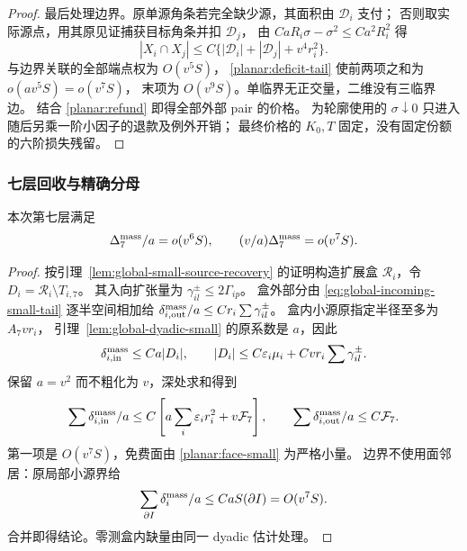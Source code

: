 \begin{proof}
最后处理边界。原单源角条若完全缺少源，其面积由 \(\mathscr D_i\) 支付；
否则取实际源点，用其原见证捕获目标角条并扣 \(\mathscr D_j\)，
由 \(CaR_i\sigma-\sigma^2\le Ca^2R_i^2\) 得
\[
 |X_i\cap X_j|\le
 C\{ |\mathscr D_i|+|\mathscr D_j|+v^4r_i^2\}.
\]
与边界关联的全部端点权为 \(O(v^5S)\)，
\eqref{planar:deficit-tail} 使前两项之和为 \(o(av^5S)=o(v^7S)\)，
末项为 \(O(v^9S)\)。单临界无正交量，二维没有三临界边。
结合 \eqref{planar:refund} 即得全部外部 pair 的价格。
为轮廓使用的 \(\sigma\downarrow0\) 只进入随后另乘一阶小因子的退款及例外开销；
最终价格的 \(K_0,T\) 固定，没有固定份额的六阶损失残留。
\end{proof}

\subsubsection{七层回收与精确分母}

\begin{lemma}[末层真实删除量]\label{planar:deletion}
本次第七层满足
\begin{equation}\label{planar:deletion-small}
 \Delta_7^{\rm mass}/a=o(v^6S),\qquad
 (v/a)\Delta_7^{\rm mass}=o(v^7S).
\end{equation}
\end{lemma}
\begin{proof}
按引理~\ref{lem:global-small-source-recovery} 的证明构造扩展盒
\(\mathcal R_i\)，令 \(D_i=\mathcal R_i\setminus T_{i,7}\)。
其入向扩张量为 \(\gamma_{il}^{\pm}\le2\Gamma_{ip}\)。
盒外部分由 \eqref{eq:global-incoming-small-tail} 逐半空间相加给
\(\delta_{i,\rm out}^{\rm mass}/a\le Cr_i\sum\gamma_{il}^{\pm}\)。
盒内小源原指定半径至多为 \(A_7vr_i\)，
引理~\ref{lem:global-dyadic-small} 的原系数是 \(a\)，因此
\[
 \delta_{i,\rm in}^{\rm mass}\le Ca|D_i|,
 \qquad |D_i|\le C\varepsilon_i\mu_i+Cv r_i\sum\gamma_{il}^{\pm}.
\]
保留 \(a=v^2\) 而不粗化为 \(v\)，深处求和得到
\[
 \sum\delta_{i,\rm in}^{\rm mass}/a
 \le C\left[a\sum_i\varepsilon_i r_i^2+v\mathcal F_7\right],
 \qquad \sum\delta_{i,\rm out}^{\rm mass}/a\le C\mathcal F_7.
\]
第一项是 \(O(v^7S)\)，免费面由 \eqref{planar:face-small} 为严格小量。
边界不使用面邻居：原局部小源界给
\[
 \sum_{\partial I}\delta_i^{\rm mass}/a\le CaS(\partial I)=O(v^7S).
\]
合并即得结论。零测盒内缺量由同一 dyadic 估计处理。
\end{proof}

